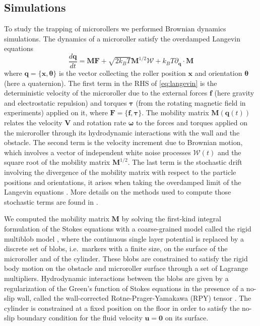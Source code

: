 \documentclass[12pt]{article}
\newcommand{\bs}[1]{\boldsymbol{#1}}
\newcommand{\mc}[1]{\mathcal{#1}}
\def\bx{\bs{x}}
\def\bM{\bs{M}}
\def\bomega{\bs{\omega}}
\def\btau{\bs \tau}
\def\bu{\bs{u}}
\def\bV{\bs{V}}
\def\bF{\bs{F}}
\def\bbf{\bs{f}}
\def\bq{\bs{q}}
\def\bzero{\bs{0}}
\def\btheta{\bs \theta}
\begin{document}
\subsection*{Simulations}
To study the trapping of microrollers we performed Brownian dynamics simulations. The dynamics of a microroller satisfy the overdamped Langevin equations \cite{sprinkle2017large}
\begin{equation}
\frac{d\bq}{dt} = \bM \bF + \sqrt{2k_BT}\bM^{1/2}\bs{\mc{W}} + k_BT\partial_{\bq}\cdot\bM
\label{eq:langevin}
\end{equation}
 where $\bq = \{\bx,\btheta\}$ is the vector collecting the roller position $\bx$ and orientation $\btheta$ (here a quaternion). The first term in the RHS of  \eqref{eq:langevin} is the deterministic velocity of the microroller due to the external forces $\bbf$ (here gravity and electrostatic repulsion) and torques $\btau$ (from the rotating magnetic field in experiments)  applied on it, where $\bF=\{\bbf,\btau\}$. The mobility matrix $\bM(\bq(t))$  relates the velocity $\bV$ and rotation rate $\bomega$ to the forces and torques applied on the microroller  through  its hydrodynamic interactions with the wall and the obstacle. The second term is the velocity increment due to  Brownian motion, which involves a vector of independent white noise processes $\bs{\mc{W}}(t)$ and the square root of the mobility matrix $\bM^{1/2}$. The last  term is the stochastic drift  involving the divergence of the mobility matrix with respect to the particle positions and orientations, it  arises when taking the overdamped limit of the Langevin equations \cite{Grassia1996}. More details on the methods used to compute those stochastic terms are found in \cite{sprinkle2017large}.

We computed the mobility matrix $\bM$ by solving the first-kind integral formulation of the Stokes equations with a coarse-grained model called the rigid multiblob model \cite{balboa2017hydrodynamics}, where the continuous single layer potential is replaced by a discrete set of blobs, i.e.\ markers with a finite size, on the surface of the microroller and of the cylinder. These blobs are constrained to satisfy the rigid body motion on the obstacle and microroller surface through a set of Lagrange multipliers.
Hydrodynamic interactions between the blobs are given by a regularization of the Green's function of Stokes equations in the presence of a no-slip wall, called the wall-corrected Rotne-Prager-Yamakawa (RPY) tensor \cite{Swan2007}. The cylinder is constrained at a fixed position on the floor in order to satisfy the no-slip boundary condition for the fluid velocity $\bu=\bzero$ on its surface. 
\end{document}
